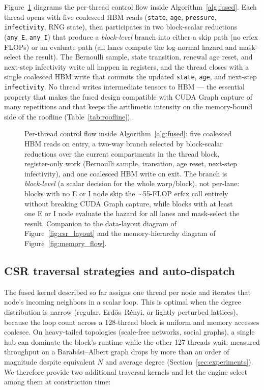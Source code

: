 \documentclass[a4paper,fleqn]{cas-sc}
\theoremstyle{definition}
\theoremstyle{remark}
\begin{document}
Figure~\ref{fig:fused_step} diagrams the per-thread control flow inside Algorithm~\ref{alg:fused}. Each thread opens with five coalesced HBM reads (\texttt{state}, \texttt{age}, \texttt{pressure}, \texttt{infectivity}, RNG state), then participates in two block-scalar reductions (\texttt{any\_E}, \texttt{any\_I}) that produce a \emph{block-level} branch into either a skip path (no $\mathrm{erfcx}$ FLOPs) or an evaluate path (all lanes compute the log-normal hazard and mask-select the result). The Bernoulli sample, state transition, renewal age reset, and next-step infectivity write all happen in registers, and the thread closes with a single coalesced HBM write that commits the updated \texttt{state}, \texttt{age}, and next-step \texttt{infectivity}. No thread writes intermediate tensors to HBM --- the essential property that makes the fused design compatible with CUDA Graph capture of many repetitions and that keeps the arithmetic intensity on the memory-bound side of the roofline (Table~\ref{tab:roofline}).

\begin{figure}[!htbp]
\centering

\caption{Per-thread control flow inside Algorithm~\ref{alg:fused}: five coalesced HBM reads on entry, a two-way branch selected by block-scalar reductions over the current compartments in the thread block, register-only work (Bernoulli sample, transition, age reset, next-step infectivity), and one coalesced HBM write on exit. The branch is \emph{block-level} (a scalar decision for the whole warp/block), not per-lane: blocks with no E or I node skip the $\sim$55-FLOP $\mathrm{erfcx}$ call entirely without breaking CUDA Graph capture, while blocks with at least one E or I node evaluate the hazard for all lanes and mask-select the result. Companion to the data-layout diagram of Figure~\ref{fig:csr_layout} and the memory-hierarchy diagram of Figure~\ref{fig:memory_flow}.}
\label{fig:fused_step}
\end{figure}

\subsection{CSR traversal strategies and auto-dispatch}
\label{sec:csr_dispatch}

The fused kernel described so far assigns one thread per node and iterates that node's incoming neighbors in a scalar loop. This is optimal when the degree distribution is narrow (regular, Erd\H{o}s--R\'{e}nyi, or lightly perturbed lattices), because the loop count across a 128-thread block is uniform and memory accesses coalesce. On heavy-tailed topologies (scale-free networks, social graphs), a single hub can dominate the block's runtime while the other 127 threads wait: measured throughput on a Barab\'{a}si--Albert graph drops by more than an order of magnitude despite equivalent $N$ and average degree (Section~\ref{sec:experiments}).
We therefore provide two additional traversal kernels and let the engine select among them at construction time:
\end{document}
